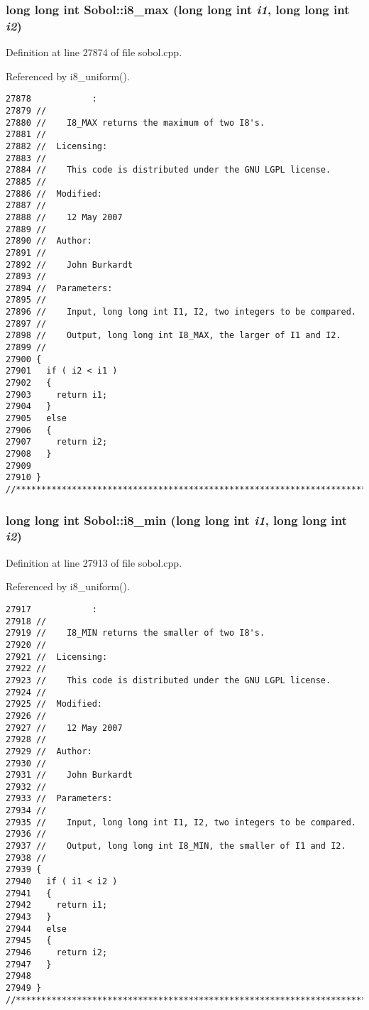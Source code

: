 \subsubsection{\setlength{\rightskip}{0pt plus 5cm}long long int Sobol::i8\_\-max (long long int {\em i1}, long long int {\em i2})}\label{namespaceSobol_c71aa59df2cc3a7f4cc4508d3ee6397a}




Definition at line 27874 of file sobol.cpp.

Referenced by i8\_\-uniform().

\begin{Code}\begin{verbatim}27878            :
27879 //
27880 //    I8_MAX returns the maximum of two I8's.
27881 //
27882 //  Licensing:
27883 //
27884 //    This code is distributed under the GNU LGPL license. 
27885 //
27886 //  Modified:
27887 //
27888 //    12 May 2007
27889 //
27890 //  Author:
27891 //
27892 //    John Burkardt
27893 //
27894 //  Parameters:
27895 //
27896 //    Input, long long int I1, I2, two integers to be compared.
27897 //
27898 //    Output, long long int I8_MAX, the larger of I1 and I2.
27899 //
27900 {
27901   if ( i2 < i1 ) 
27902   {
27903     return i1;
27904   }
27905   else 
27906   {
27907     return i2;
27908   }
27909 
27910 }
//****************************************************************************80
\end{verbatim}
\end{Code}


\subsubsection{\setlength{\rightskip}{0pt plus 5cm}long long int Sobol::i8\_\-min (long long int {\em i1}, long long int {\em i2})}\label{namespaceSobol_be6c43b630ae37e4f3d18fde2495dfda}




Definition at line 27913 of file sobol.cpp.

Referenced by i8\_\-uniform().

\begin{Code}\begin{verbatim}27917            :
27918 //
27919 //    I8_MIN returns the smaller of two I8's.
27920 //
27921 //  Licensing:
27922 //
27923 //    This code is distributed under the GNU LGPL license. 
27924 //
27925 //  Modified:
27926 //
27927 //    12 May 2007
27928 //
27929 //  Author:
27930 //
27931 //    John Burkardt
27932 //
27933 //  Parameters:
27934 //
27935 //    Input, long long int I1, I2, two integers to be compared.
27936 //
27937 //    Output, long long int I8_MIN, the smaller of I1 and I2.
27938 //
27939 {
27940   if ( i1 < i2 ) 
27941   {
27942     return i1;
27943   }
27944   else 
27945   {
27946     return i2;
27947   }
27948 
27949 }
//****************************************************************************80
\end{verbatim}
\end{Code}


